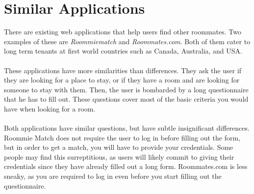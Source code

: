 \documentclass[journal]{./IEEE/IEEEtran}
\begin{document}
\section{Similar Applications}
There are existing web applications that help users find other roommates. Two examples of these are \textit{ Roommiematch} and \textit{Roommates.com}. Both of them cater to long term tenants at first world countries such as Canada, Australia, and USA.
\\
\\
These applications have more similarities than differences. They ask the user if they are looking for a place to stay, or if they have a room and are looking for someone to stay with them. Then, the user is bombarded by a long questionnaire that he has to fill out. These questions cover most of the basic criteria you would have when looking for a room.
\\
\\
\indent Both applications have similar questions, but have subtle insignificant differences. Roommie Match does not require the user to log in before filling out the form, but in order to get a match, you will have to provide your credentials. Some people may find this surreptitious, as users will likely commit to giving their credentials since they have already filled out a long form. Roommates.com is less sneaky, as you are required to log in even before you start filling out the questionnaire.
\end{document}
